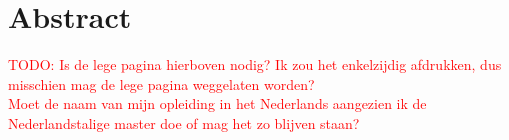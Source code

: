 \section*{Abstract}\enlargethispage{1.5\baselineskip}

\textcolor{red}{TODO: Is de lege pagina hierboven nodig? Ik zou het enkelzijdig afdrukken, dus misschien mag de lege pagina weggelaten worden? \\ Moet de naam van mijn opleiding in het Nederlands aangezien ik de Nederlandstalige master doe of mag het zo blijven staan?}